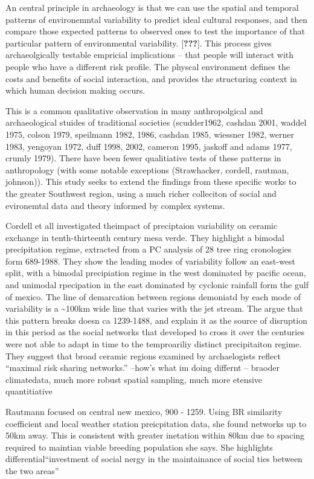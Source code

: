 \documentclass[10pt,letterpaper]{article}
\begin{document}
An central principle in archaeology is that we can use the spatial and
temporal patterns of environemntal variability to predict ideal cultural
responses, and then compare those expected patterns to observed ones to
test the importance of that particular pattern of environmental
variability. {[}{\textbf{???}}{]}. This process gives archaeolgically
testable empricial implications -- that people will interact with people
who have a different risk profile. The physcal environment defines the
costs and benefits of social interaction, and provides the structuring
context in which human decision making occurs.

This is a common qualitative observation in many anthropolgical and
archaeological stuides of traditional societies (scudder1962, cashdan
2001, waddel 1975, colson 1979, speilmann 1982, 1986, cashdan 1985,
wiessner 1982, werner 1983, yengoyan 1972, duff 1998, 2002, cameron
1995, jaskoff and adams 1977, crumly 1979). There have been fewer
qualitiative tests of these patterns in anthropology (with some notable
exceptions (Strawhacker, cordell, rautman, johnson)). This study seeks
to extend the findings from these specific works to the greater
Southwest region, using a much richer colleciton of social and
evironemtal data and theory informed by complex systems.

Cordell et all investigated theimpact of preciptaion variability on
ceramic exchange in tenth-thirteenth century mesa verde. They highlight
a bimodal precipitation regime, extracted from a PC analysis of 28 tree
ring cronologies form 689-1988. They show the leading modes of
variability follow an east-west split, with a bimodal precipiation
regime in the west dominated by pacific ocean, and unimodal rpecipation
in the east dominated by cyclonic rainfall form the gulf of mexico. The
line of demarcation between regions demoniatd by each mode of
variability is a \textasciitilde{}100km wide line that varies with the
jet stream. The argue that this pattern breaks doesn ca 1239-1488, and
explain it as the source of disruption in this period as the social
networks that developed to cross it over the centuries were not able to
adapt in time to the temproariliy distinct precipitaiton regime. They
suggest that broad ceramic regions examined by archaelogists reflect
``maximal risk sharing networks.'' --how's what im doing differnt --
braoder climatedata, much more robust spatial sampling, much more
etensive quantitiative

Rautmann focused on central new mexico, 900 - 1259. Using BR similarity
coefficient and local weather station preicpitation data, she found
networks up to 50km away. This is consistent with greater inetation
within 80km due to spacing required to maintian viable breeding
population she says. She highlights differential``investment of social
nergy in the maintainance of social ties between the two areas''
\end{document}
